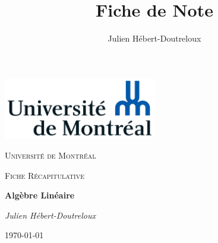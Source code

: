 \documentclass{article}[french, babel]
\author{Julien Hébert-Doutreloux}
\title{Fiche de Note}
\begin{document}
		\begin{titlepage}
		\centering
		\includegraphics[width=0.5\textwidth]{Universite_de_Montreal_logo}\par\vspace{1cm}
		{\scshape\LARGE Université de Montréal\par}
		\vspace{1cm}
		{\scshape\Large Fiche Récapitulative\par}
		\vspace{1.5cm}
		{\huge\bfseries Algèbre Linéaire\par}
		\vspace{2cm}
		{\Large\itshape Julien Hébert-Doutreloux\par}
		\vfill
		\vfill
		{\large \today\par}
	\end{titlepage}




\end{document}
